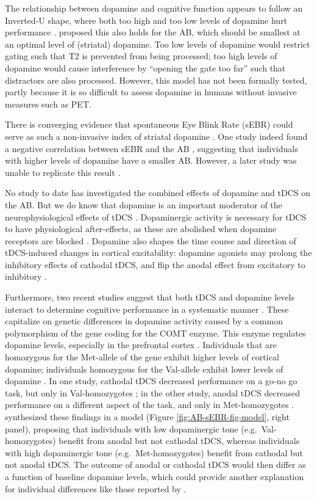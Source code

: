 \documentclass[11pt,english,]{memoir}
\begin{document}
The relationship between dopamine and cognitive function appears to follow an Inverted-U shape, where both too high and too low levels of dopamine hurt performance \autocite{Cools2011}. \textcite{Slagter2012} proposed this also holds for the AB, which should be smallest at an optimal level of (striatal) dopamine. Too low levels of dopamine would restrict gating such that T2 is prevented from being processed; too high levels of dopamine would cause interference by ``opening the gate too far'' such that distractors are also processed. However, this model has not been formally tested, partly because it is so difficult to assess dopamine in humans without invasive measures such as PET.

There is converging evidence that spontaneous Eye Blink Rate (sEBR) could serve as such a non-invasive index of striatal dopamine \autocite[for a review, see][]{Jongkees2016}. One study indeed found a negative correlation between sEBR and the AB \autocite{Colzato2008}, suggesting that individuals with higher levels of dopamine have a smaller AB. However, a later study was unable to replicate this result \autocite{Slagter2013}.

No study to date has investigated the combined effects of dopamine and tDCS on the AB. But we do know that dopamine is an important moderator of the neurophysiological effects of tDCS \autocite{Stagg2011b}. Dopaminergic activity is necessary for tDCS to have physiological after-effects, as these are abolished when dopamine receptors are blocked \autocite{Nitsche2006}. Dopamine also shapes the time course and direction of tDCS-induced changes in cortical excitability: dopamine agonists may prolong the inhibitory effects of cathodal tDCS, and flip the anodal effect from excitatory to inhibitory \autocite{Kuo2008}.

Furthermore, two recent studies suggest that both tDCS and dopamine levels interact to determine cognitive performance in a systematic manner \autocite{Wiegand2016}. These capitalize on genetic differences in dopamine activity caused by a common polymorphism of the gene coding for the COMT enzyme. This enzyme regulates dopamine levels, especially in the prefrontal cortex \autocite{Kaenmaki2010}. Individuals that are homozygous for the Met-allele of the gene exhibit higher levels of cortical dopamine; individuals homozygous for the Val-allele exhibit lower levels of dopamine \autocite{Schacht2016}. In one study, cathodal tDCS decreased performance on a go-no go task, but only in Val-homozygotes \autocite{Nieratschker2015}; in the other study, anodal tDCS decreased performance on a different aspect of the task, and only in Met-homozygotes \autocite{Plewnia2013}. \textcite{Wiegand2016} synthesized these findings in a model (Figure \ref{fig:AB-sEBR-fig-model}, right panel), proposing that individuals with low dopaminergic tone (e.g.~Val-homozygotes) benefit from anodal but not cathodal tDCS, whereas individuals with high dopaminergic tone (e.g.~Met-homozygotes) benefit from cathodal but not anodal tDCS. The outcome of anodal or cathodal tDCS would then differ as a function of baseline dopamine levels, which could provide another explanation for individual differences like those reported by \textcite{London2015}.
\end{document}
